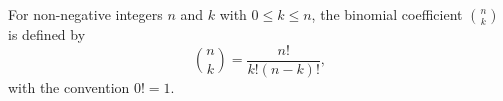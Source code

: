 For non-negative integers $n$ and $k$ with $0 \leq k \leq n$, the binomial coefficient $\binom{n}{k}$ is defined by
$$\binom{n}{k} = \frac{n!}{k!(n - k)!},$$
with the convention $0! = 1$.
